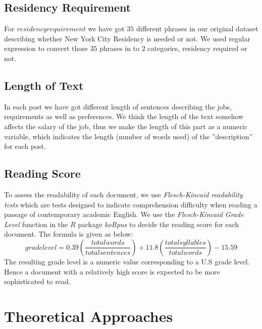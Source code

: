 \documentclass[9pt,notitlepage]{article}		%
\begin{document}
\subsection*{Residency Requirement}
For $residency requirement$ we have got $35$ different phrases in our original dataset describing whether New York City Residency is needed or not. We used regular expression to convert those $35$ phrases in to $2$ categories, residency required or not.
\subsection*{Length of Text}
In each post we have got different length of sentences describing the jobs, requirements as well as preferences. We think the length of the text somehow affects the salary of the job, thus we make the length of this part as a numeric variable, which indicates the length (number of words used) of the ''description'' for each post.
 \subsection*{Reading Score}
To assess the readability of each document, we use \textit{Flesch-Kincaid readability tests} which are tests designed to indicate comprehension difficulty when reading a passage of contemporary academic English. We use the \textit {Flesch-Kincaid Grade Level} function in the $R$ package \textit{koRpus} to decide the reading score for each document. The formula is given as below:
\begin{equation}
grade level=0.39 (\frac{total words}{total sentences}) + 11.8 (\frac{total syllables}{totalwords})-15.59
\end{equation}
The resulting grade level is a numeric value corresponding to a U.S grade level. Hence a document with a relatively high score is expected to be more sophisticated to read. 
  \hspace{0.5cm} \vspace{0.3cm}
\section{Theoretical Approaches}
\end{document}
